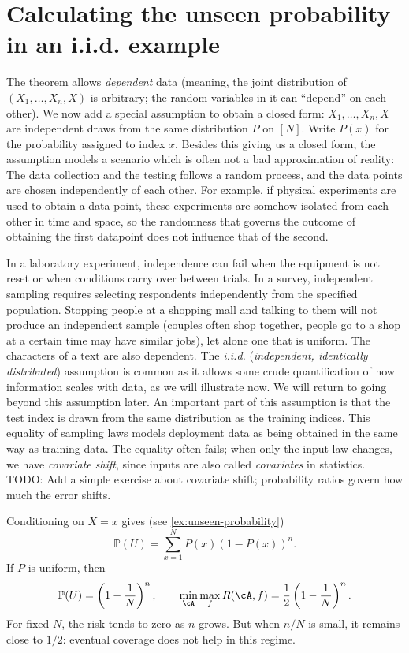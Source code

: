 \documentclass[11pt,twoside]{article}
\renewcommand{\P}{\mathbb P}
\theoremstyle{definition}
\theoremstyle{remark}
\begin{document}
\section{Calculating the unseen probability in an i.i.d. example}
\label{sec:iid}

The theorem allows \emph{dependent} data
(meaning, the joint distribution of $(X_1,\dots,X_n,X)$ is arbitrary; the random variables in it can ``depend'' on each other).
We now add a special assumption to
obtain a closed form: $X_1,\ldots,X_n,X$ are independent
draws from the same distribution $P$ on $[N]$. Write $P(x)$ for the
probability assigned to index $x$.
Besides this giving us a closed form, the  assumption models a scenario
which is often not a bad approximation of reality:
The data collection and the testing follows a random process,
and the data points are chosen independently of each other.
For example, if physical experiments are used to obtain a data point,
these experiments are somehow isolated from each other in time and space,
so the randomness that governs the outcome of obtaining the first datapoint
does not influence that of the second.

In a laboratory experiment, independence can fail when the equipment is not
reset or when conditions carry over between trials.
In a survey, independent sampling requires selecting respondents independently
from the specified population. Stopping people at a shopping mall
and talking to them will not produce an independent sample (couples often
shop together, people go to a shop at a certain time may have similar jobs),
let alone one that is uniform. The characters of a text are also dependent.
The \emph{i.i.d.} (\emph{independent, identically distributed})
assumption is common as it allows some crude quantification of
how information scales with data, as we will illustrate now. We will return to going beyond this assumption later.
An important part of this assumption is that the test index is drawn from the
same distribution as the training indices. This equality of sampling laws
models deployment data as being obtained in the same way as training data.
The equality often fails; when only the input law changes, we have
\emph{covariate shift}, since inputs are also called \emph{covariates} in
statistics.
TODO: Add a simple exercise about covariate shift; probability ratios govern how much the error shifts.

Conditioning on $X=x$ gives
(see \cref{ex:unseen-probability})
\begin{equation}
\P(U)=\sum_{x=1}^N P(x)(1-P(x))^n.
\label{eq:unseen-iid}
\end{equation}
If $P$ is uniform, then
\begin{equation}
\P(U)=\left(1-\frac1N\right)^n,
\qquad
\min_{\cA}\max_f R(\cA,f)
=\frac12\left(1-\frac1N\right)^n.
\label{eq:uniform-risk}
\end{equation}
For fixed $N$, the risk tends to zero as $n$ grows. But when $n/N$ is small,
it remains close to $1/2$: eventual coverage does not help in this regime.
\end{document}
